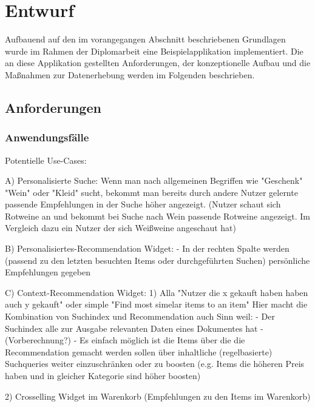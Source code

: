 \section{Entwurf}

Aufbauend auf den im vorangegangen Abschnitt beschriebenen Grundlagen wurde im Rahmen der Diplomarbeit eine Beispielapplikation implementiert. Die an diese Applikation gestellten Anforderungen, der konzeptionelle Aufbau und die Maßnahmen zur Datenerhebung werden im Folgenden beschrieben.

\subsection{Anforderungen}



\subsubsection{Anwendungsfälle}










Potentielle Use-Cases:

A) Personalisierte Suche:
  Wenn man nach allgemeinen Begriffen wie "Geschenk" "Wein" oder "Kleid" sucht, bekommt man bereits durch andere Nutzer gelernte passende Empfehlungen in der Suche höher angezeigt.
  (Nutzer schaut sich Rotweine an und bekommt bei Suche nach Wein passende Rotweine angezeigt. Im Vergleich dazu ein Nutzer der sich Weißweine angeschaut hat)

B) Personalisiertes-Recommendation Widget:
 - In der rechten Spalte werden (passend zu den letzten besuchten Items oder durchgeführten Suchen) persönliche Empfehlungen gegeben


C) Context-Recommendation Widget:
1) Alla "Nutzer die x gekauft haben haben auch y gekauft" oder simple "Find most simelar items to an item"
Hier macht die Kombination von Suchindex und Recommendation auch Sinn weil:
- Der Suchindex alle zur Ausgabe relevanten Daten eines Dokumentes hat
- (Vorberechnung?)
- Es einfach möglich ist die Items über die die Recommendation gemacht werden sollen über inhaltliche (regelbasierte) Suchqueries weiter einzuschränken oder zu boosten (e.g. Items die höheren Preis haben und in gleicher Kategorie sind höher boosten)

2) Crosselling Widget im Warenkorb (Empfehlungen zu den Items im Warenkorb)

